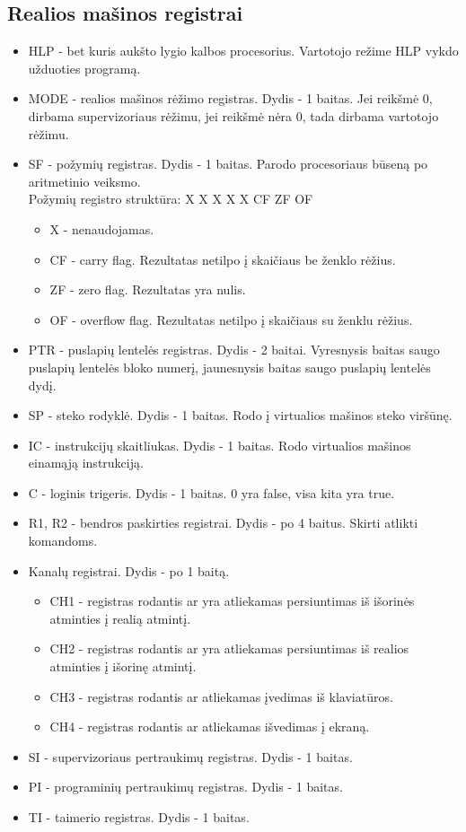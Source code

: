 \documentclass[12pt]{article}
\begin{document}
	\subsection{Realios mašinos registrai}
	\begin{itemize}
	\item HLP - bet kuris aukšto lygio kalbos procesorius. Vartotojo režime HLP vykdo užduoties programą.
	\item MODE - realios mašinos rėžimo registras. Dydis - 1 baitas. Jei reikšmė 0, dirbama supervizoriaus rėžimu, jei reikšmė nėra 0, tada dirbama vartotojo rėžimu.
	\item SF - požymių registras. Dydis - 1 baitas. Parodo procesoriaus būseną po aritmetinio veiksmo.\\
	Požymių registro struktūra: X X X X X CF ZF OF
	\begin{itemize}
		\item X - nenaudojamas.
		\item CF - carry flag. Rezultatas netilpo į skaičiaus be ženklo rėžius.
		\item ZF - zero flag. Rezultatas yra nulis.
		\item OF - overflow flag. Rezultatas netilpo į skaičiaus su ženklu rėžius.
	\end{itemize}
	\item PTR - puslapių lentelės registras. Dydis - 2 baitai. Vyresnysis baitas saugo puslapių lentelės bloko numerį, jaunesnysis baitas saugo puslapių lentelės dydį.
	\item SP - steko rodyklė. Dydis - 1 baitas. Rodo į virtualios mašinos steko viršūnę.
	\item IC - instrukcijų skaitliukas. Dydis - 1 baitas. Rodo virtualios mašinos einamąją instrukciją.
	\item C - loginis trigeris. Dydis - 1 baitas. 0 yra false, visa kita yra true.
	\item R1, R2 - bendros paskirties registrai. Dydis - po 4 baitus. Skirti atlikti komandoms.
	\item Kanalų registrai. Dydis - po 1 baitą.
	\begin{itemize}
		\item CH1 - registras rodantis ar yra atliekamas persiuntimas iš išorinės atminties į realią atmintį.
		\item CH2 - registras rodantis ar yra atliekamas persiuntimas iš realios atminties į išorinę atmintį.
		\item CH3 - registras rodantis ar atliekamas įvedimas iš klaviatūros.
		\item CH4 - registras rodantis ar atliekamas išvedimas į ekraną.
	\end{itemize}
	\item SI - supervizoriaus pertraukimų registras. Dydis - 1 baitas. 
	\item PI - programinių pertraukimų registras. Dydis - 1 baitas.
	\item TI - taimerio registras. Dydis - 1 baitas.
	
	\end{itemize}	
\end{document}
